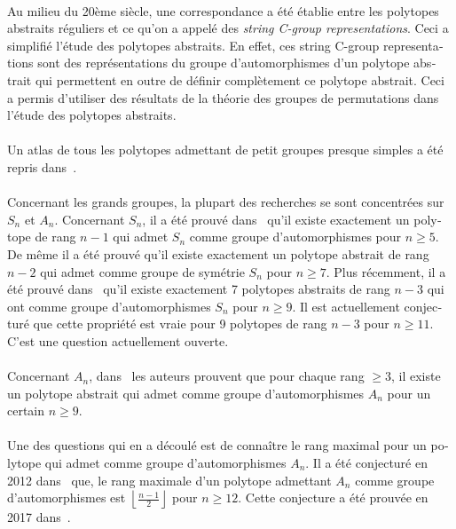 \begin{otherlanguage}{french}
\paragraph{}
Au milieu du 20ème siècle, une correspondance a été établie entre les polytopes abstraits réguliers et ce qu'on a appelé des \textit{string C-group representations}. Ceci a simplifié l'étude des polytopes abstraits. En effet, ces string C-group representations sont des représentations du groupe d'automorphismes d'un polytope abstrait qui permettent en outre de définir complètement ce polytope abstrait. Ceci a permis d'utiliser des résultats de la théorie des groupes de permutations dans l'étude des polytopes abstraits.

\paragraph{}
Un atlas de tous les polytopes admettant de petit groupes presque simples a été repris dans~\cite{atlasPolytopes}.

\paragraph{}
Concernant les grands groupes, la plupart des recherches se sont concentrées sur $S_n$ et $A_n$. Concernant $S_n$, il a été prouvé dans~\cite{highRankSym} qu'il existe exactement un polytope de rang $n-1$ qui admet $S_n$ comme groupe d'automorphismes pour $n \ge 5$. De même il a été prouvé qu'il existe exactement un polytope abstrait de rang $n-2$ qui admet comme groupe de symétrie $S_n$ pour $n \ge 7$. Plus récemment, il a été prouvé dans~\cite{leemansTransactions} qu'il existe exactement 7 polytopes abstraits de rang $n-3$ qui ont comme groupe d'automorphismes $S_n$ pour $n \ge 9$. Il est actuellement conjecturé que cette propriété est vraie pour 9 polytopes de rang $n-3$ pour $n \ge 11$. C'est une question actuellement ouverte.

\paragraph{}
Concernant $A_n$, dans~\cite{highRankAlternating} les auteurs prouvent que pour chaque rang $\ge 3$, il existe un polytope abstrait qui admet comme groupe d'automorphismes $A_n$ pour un certain $n \ge 9$.

\paragraph{}
Une des questions qui en a découlé est de connaître le rang maximal pour un polytope qui admet comme groupe d'automorphismes $A_n$. Il a été conjecturé en 2012 dans~\cite{A12PolytopesRank} que, le rang maximale d'un polytope admettant $A_n$ comme groupe d'automorphismes est $\left\lfloor\frac{n-1}{2}\right\rfloor$ pour $n \ge 12$. Cette conjecture a été prouvée en 2017 dans~\cite{highestRankOfAn}.


\end{otherlanguage}
